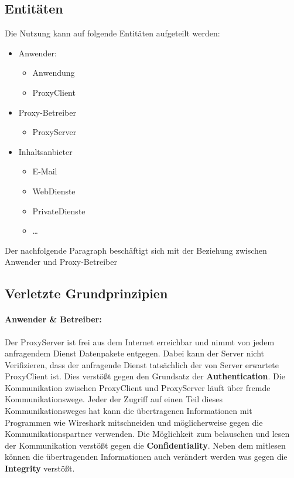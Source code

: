 \documentclass[12pt, a4paper]{scrartcl}
\begin{document}
\subsection{Entitäten}
Die Nutzung kann auf folgende Entitäten aufgeteilt werden:
\begin{itemize}
    \item Anwender:
    \begin{itemize}
        \item Anwendung
        \item ProxyClient
    \end{itemize}
    \item Proxy-Betreiber
    \begin{itemize}
        \item ProxyServer
    \end{itemize}
    \item Inhaltsanbieter
    \begin{itemize}
        \item E-Mail
        \item WebDienste
        \item PrivateDienste
        \item \ldots
    \end{itemize}
\end{itemize}
Der nachfolgende Paragraph beschäftigt sich mit der Beziehung zwischen Anwender und Proxy-Betreiber
\subsection{Verletzte Grundprinzipien}
\paragraph{Anwender \& Betreiber:}
\noindent Der ProxyServer ist frei aus dem Internet erreichbar und nimmt von jedem anfragendem Dienst Datenpakete entgegen. Dabei kann der Server nicht Verifizieren, dass der anfragende Dienst tatsächlich der von Server erwartete ProxyClient ist. Dies verstößt gegen den Grundsatz der \textbf{Authentication}.\newline
Die Kommunikation zwischen ProxyClient und ProxyServer läuft über fremde Kommunikationswege. Jeder der Zugriff auf einen Teil dieses Kommunikationsweges hat kann die übertragenen Informationen mit Programmen wie Wireshark mitschneiden und möglicherweise gegen die Kommunikationspartner verwenden. Die Möglichkeit zum belauschen und lesen der Kommunikation verstößt gegen die \textbf{Confidentiality}.\newline
Neben dem mitlesen können die übertragenden Informationen auch verändert werden was gegen die \textbf{Integrity} verstößt.
\end{document}
